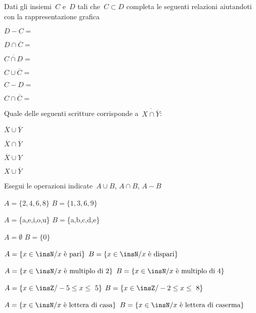 \begin{esercizio}
\label{ese:7.55}
Dati gli insiemi~$C$ e~$D$ tali che~$C\subset D$
completa le seguenti relazioni aiutandoti con la rappresentazione
grafica
\begin{multicols}{3}
\begin{enumeratea}
\item $D-C=$
\item $D\cap \overline{C}=$
\item $\overline{{C\cap D}}=$
\item $C\cup \overline{C}=$
\item $C-D=$
\item $C\cap \overline{C}=$
\end{enumeratea}
\end{multicols}
\end{esercizio}

\begin{esercizio}
\label{ese:7.56}
Quale delle seguenti scritture corrisponde a~$\overline{{X\cap \overline{Y}}}$:
\begin{multicols}{4}
 \begin{enumeratea}
 \item $\overline{X}\cup \overline{Y}$
 \item $\overline{X}\cap \overline{Y}$
 \item $\overline{X}\cup Y$
 \item $X\cup \overline{Y}$
 \end{enumeratea}
\end{multicols}
\end{esercizio}


\begin{esercizio}
\label{ese:7.57}
Esegui le operazioni indicate~$A\cup B$, $A\cap B$, $A-B$

\begin{enumeratea}
\item $A=\{2,4,6,8\}$ $B=\{1,3,6,9\}$
\item $A=$\{a,e,i,o,u\} $B=$\{a,b,c,d,e\}
\item $A=\emptyset $ $B=\{0\}$
\item $A=\{x\in\insN/ x\text{ è pari}\}$ $B=\{x\in\insN/ x\text{ è dispari}\}$
\item $A=\{x\in\insN/ x\text{ è multiplo di~2}\}$ $B=\{x\in\insN/ x\text{ è 
multiplo di~4}\}$
\item $A=\{x\in\insZ/-5\le x\le~5\}$ $B=\{x\in\insZ/-2\le x\le~8\}$
\item $A=\{x\in\insN/ x\text{ è lettera di casa}\}$ $B=\{x\in\insN/ x\text{ è 
lettera di caserma}\}$
\end{enumeratea}
\end{esercizio}

